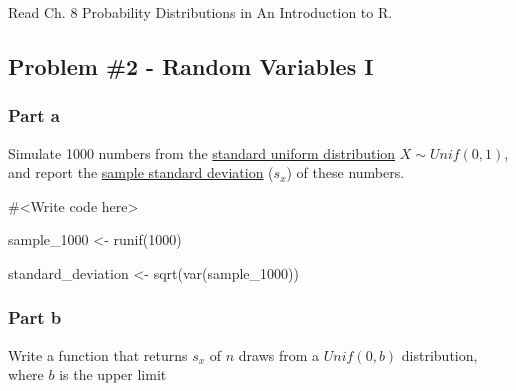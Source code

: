 \documentclass[
  letterpaper,
  DIV=11,
  numbers=noendperiod]{scrartcl}
\newenvironment{Shaded}{\begin{snugshade}}{\end{snugshade}}
\newcommand{\CommentTok}[1]{\textcolor[rgb]{0.37,0.37,0.37}{#1}}
\newcommand{\DecValTok}[1]{\textcolor[rgb]{0.68,0.00,0.00}{#1}}
\newcommand{\FunctionTok}[1]{\textcolor[rgb]{0.28,0.35,0.67}{#1}}
\newcommand{\NormalTok}[1]{\textcolor[rgb]{0.00,0.23,0.31}{#1}}
\newcommand{\OtherTok}[1]{\textcolor[rgb]{0.00,0.23,0.31}{#1}}
\begin{document}
Read Ch. 8 Probability Distributions in An Introduction to R.

\hypertarget{problem-2---random-variables-i}{%
\subsection{Problem \#2 - Random Variables
I}\label{problem-2---random-variables-i}}

\hypertarget{part-a-1}{%
\subsubsection{Part a}\label{part-a-1}}

Simulate 1000 numbers from the
\href{https://en.wikipedia.org/wiki/Continuous_uniform_distribution}{standard
uniform distribution} \(X \sim Unif(0,1)\), and report the
\href{https://en.wikipedia.org/wiki/Standard_deviation\#Sample_standard_deviation}{sample
standard deviation} (\(s_{x}\)) of these numbers.

\begin{Shaded}
\begin{Highlighting}[]
\CommentTok{\#\textless{}Write code here\textgreater{}}

\NormalTok{sample\_1000 }\OtherTok{\textless{}{-}} \FunctionTok{runif}\NormalTok{(}\DecValTok{1000}\NormalTok{)}

\NormalTok{standard\_deviation }\OtherTok{\textless{}{-}} \FunctionTok{sqrt}\NormalTok{(}\FunctionTok{var}\NormalTok{(sample\_1000))}
\end{Highlighting}
\end{Shaded}

\hypertarget{part-b-1}{%
\subsubsection{Part b}\label{part-b-1}}

Write a function that returns \(s_{x}\) of \(n\) draws from a
\(Unif(0,b)\) distribution, where \(b\) is the upper limit
\end{document}
